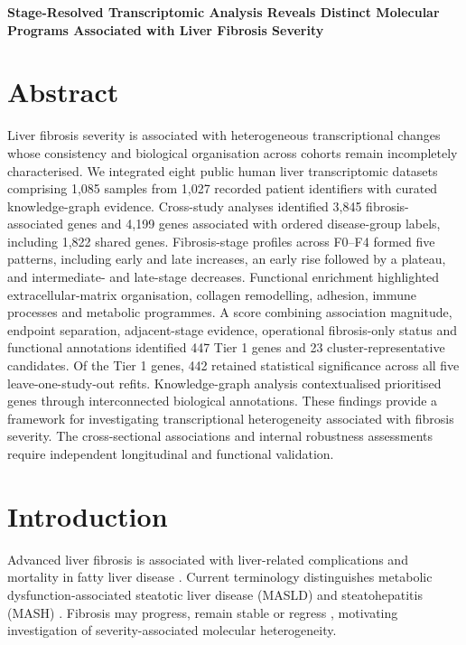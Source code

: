 \documentclass[11pt,a4paper]{article}
\begin{document}
{\centering\Large\bfseries Stage-Resolved Transcriptomic Analysis Reveals Distinct Molecular Programs Associated with Liver Fibrosis Severity\par}



\section*{Abstract}
Liver fibrosis severity is associated with heterogeneous transcriptional changes whose consistency and biological organisation across cohorts remain incompletely characterised. We integrated eight public human liver transcriptomic datasets comprising 1,085 samples from 1,027 recorded patient identifiers with curated knowledge-graph evidence. Cross-study analyses identified 3,845 fibrosis-associated genes and 4,199 genes associated with ordered disease-group labels, including 1,822 shared genes. Fibrosis-stage profiles across F0--F4 formed five patterns, including early and late increases, an early rise followed by a plateau, and intermediate- and late-stage decreases. Functional enrichment highlighted extracellular-matrix organisation, collagen remodelling, adhesion, immune processes and metabolic programmes. A score combining association magnitude, endpoint separation, adjacent-stage evidence, operational fibrosis-only status and functional annotations identified 447 Tier 1 genes and 23 cluster-representative candidates. Of the Tier 1 genes, 442 retained statistical significance across all five leave-one-study-out refits. Knowledge-graph analysis contextualised prioritised genes through interconnected biological annotations. These findings provide a framework for investigating transcriptional heterogeneity associated with fibrosis severity. The cross-sectional associations and internal robustness assessments require independent longitudinal and functional validation.

\section*{Introduction}
Advanced liver fibrosis is associated with liver-related complications and mortality in fatty liver disease \cite{ref1,ref2}. Current terminology distinguishes metabolic dysfunction-associated steatotic liver disease (MASLD) and steatohepatitis (MASH) \cite{ref3}. Fibrosis may progress, remain stable or regress \cite{singh2015}, motivating investigation of severity-associated molecular heterogeneity.
\end{document}
